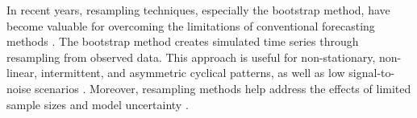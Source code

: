 \documentclass[opre,sglanonrev,11pt]{informs4}
\begin{document}


In recent years, resampling techniques, especially the bootstrap method, have become valuable for overcoming the limitations of conventional forecasting methods \citep{hasni2019spare}. The bootstrap method creates simulated time series through resampling from observed data. This approach is useful for non-stationary, non-linear, intermittent, and asymmetric cyclical patterns, as well as low signal-to-noise scenarios \citep{feliu2024enhancing, suman2024deep, kreiss2012bootstrap}. Moreover, resampling methods help address the effects of limited sample sizes \citep{davison1997bootstrap}  and model uncertainty \citep{sarris2020exploiting}. 
\end{document}
